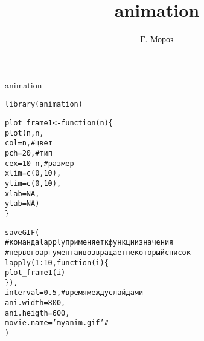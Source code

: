 
\title[]{animation}
\author[]{Г. Мороз}
\date{}

\frame{\titlepage}
\begin{frame}[fragile]{animation}
\scriptsize
\begin{alltt}
library(animation)

plot_frame1 <- function(n) \{
plot(n, n,
     col = n, \hfill # цвет
     pch = 20, \hfill  # тип
     cex = 10 - n, \hfill  # размер
     xlim = c(0, 10),
     ylim = c(0, 10),
     xlab = NA,
     ylab = NA)
\}

saveGIF(
# команда lapply применяет к функции значения
# первого аргумента и возвращает некоторый список
  lapply(1:10, function(i) \{
    plot_frame1(i)
  \}),
  interval = 0.5, # время между слайдами
  ani.width = 800,
  ani.heigth = 600,
  movie.name = 'myanim.gif' \hfill # 
)
\end{alltt}
\normalsize
\end{frame}
